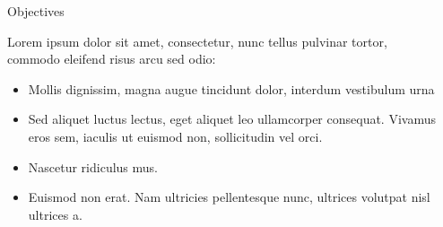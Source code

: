 \documentclass{article}
\begin{document}
\begin{frame} %

  \begin{columns}
   \begin{column}{\linewidth}
    \vskip1cm
    \centering
    \vskip1cm
   \end{column}
   \vspace{1cm}
  \end{columns}
 \vspace{1cm}


\begin{columns}[t] %

\begin{column}{\sepwid}\end{column} %

\begin{column}{\onecolwid} %


\begin{exampleblock}{Objectives}

Lorem ipsum dolor sit amet, consectetur, nunc tellus pulvinar tortor, commodo eleifend risus arcu sed odio:
\begin{itemize}
\item Mollis dignissim, magna augue tincidunt dolor, interdum vestibulum urna
\item Sed aliquet luctus lectus, eget aliquet leo ullamcorper consequat. Vivamus eros sem, iaculis ut euismod non, sollicitudin vel orci.
\item Nascetur ridiculus mus.  
\item Euismod non erat. Nam ultricies pellentesque nunc, ultrices volutpat nisl ultrices a.
\end{itemize}


\end{exampleblock}
\end{column}
\end{columns}
\end{frame}
\end{document}
